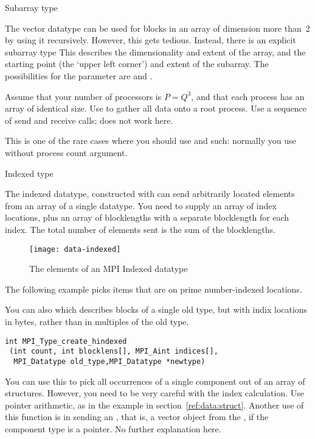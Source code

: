  {Subarray type}

The vector datatype can be used for blocks in an array of dimension
more than~2 by using it recursively. However, this gets
tedious. Instead, there is an explicit subarray type
%
%
This describes the dimensionality and extent of the array, and
the starting point (the `upper left corner') and extent of the
subarray.
The possibilities for the  parameter are
 and .

\begin{exercise}
  \label{ex:cubegather}

  Assume that your number of processors is $P=Q^3$, and that each
  process has an array of identical size. Use
   to gather all data onto a root process.
  Use a sequence of send and receive calls;
   does not work here.

\begin{tacc}
This is one of the rare cases where you should use 
and such: normally you use  without process count argument.
\end{tacc}

\end{exercise}

 {Indexed type}
\label{sec:data:indexed}

The indexed datatype, constructed with 
can send arbitrarily located elements from an array of a single datatype.
You need to supply an array of index locations, plus an array of blocklengths
with a separate blocklength for each index. The total number of elements sent
is the sum of the blocklengths.
%
%

\begin{figure}[ht]
  \texttt{[image: data-indexed]}
  \caption{The elements of an MPI Indexed datatype}
  \label{fig:data-indexed}
\end{figure}

The following example picks items that are on prime number-indexed
locations.

You can also  which describes blocks
of a single old type, but with indix locations in bytes, rather than
in multiples of the old type.
\begin{verbatim}
int MPI_Type_create_hindexed
 (int count, int blocklens[], MPI_Aint indices[],
  MPI_Datatype old_type,MPI_Datatype *newtype)
\end{verbatim}
You can use this to pick all occurrences of a single component out of
an array of structures. However, you need to be very careful with the
index calculation. Use pointer arithmetic, as in the example in
section~\ref{ref:data:struct}.  Another use of this function is in
sending an , that
is, a vector object from the , if
the component type is a pointer. No further explanation here.

